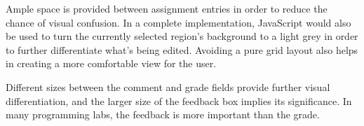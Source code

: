 Ample space is provided between assignment entries in order to reduce the chance of visual confusion. In a complete implementation, JavaScript would also be used to turn the currently selected region's background to a light grey in order to further differentiate what's being edited. Avoiding a pure grid layout also helps in creating a more comfortable view for the user.

Different sizes between the comment and grade fields provide further visual differentiation, and the larger size of the feedback box implies its significance. In many programming labs, the feedback is more important than the grade.  
